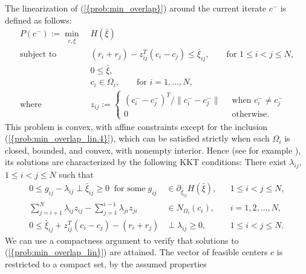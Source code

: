 \documentclass{siamltex}
\providecommand{\norm}[1]{\lVert#1\rVert}
\begin{document}
The linearization of {(\ref{{prob:min_overlap}})} around the current
iterate $c^-$ is defined as follows:
\begin{subequations}
\label{prob:min_overlap_lin}
\begin{align}
P(c^-) := \min_{c,\bar{\xi}} \; &
H(\bar{\xi}) 
\label{prob:min_overlap_lin.1}
\\
\mbox{subject to} \qquad &
(r_i + r_j) - z_{ij}^T (c_i - c_j) \leq \bar{\xi}_{ij},
\qquad \mbox{for }  1\leq i< j \leq N,
\label{prob:min_overlap_lin.2}
\\
& 0 \leq \bar{\xi}, 
\label{prob:min_overlap_lin.3}
\\
& c_i \in \Omega_i, \qquad
\mbox{for }  i = 1,\dots , N,  
\label{prob:min_overlap_lin.4}
\\
\mbox{where } \;\;
& z_{ij} := 
\begin{cases}
{(c_i^--c_j^-)^T}/{\norm{c_i^--c_j^-}} & \;\; \mbox{when $c_i^- \neq c_j^-$} \\
0 & \;\; \mbox{otherwise.}
\end{cases}
\label{prob:min_overlap_lin.5}
\end{align}
\end{subequations}
This problem is convex, with affine constraints except for the
inclusion {(\ref{{prob:min_overlap_lin.4}})}, which can be satisfied
strictly when each $\Omega_i$ is closed, bounded, and convex, with
nonempty interior. Hence (see for example
\cite[Theorem~28.2, Corollary~28.3.1]{Roc70}), its solutions are
characterized by the following KKT conditions: There exist
$\lambda_{ij}$, $1 \le i < j \le N$ such that
\begin{subequations}
\label{prob:min_overlap_lin_kkt}
\begin{align}
\label{prob:min_overlap_lin_kkt.1}
0 \le g_{ij} - \lambda_{ij}  \perp \bar{\xi}_{ij} \ge 0 \;\; \mbox{for some} \; g_{ij} 
& \in \partial_{\bar{\xi}_{ij}} H(\bar{\xi}), && 1 \le i < j \le N, 
\\
\label{prob:min_overlap_lin_kkt.2}
\sum_{j=i+1}^{N} \lambda_{ij} z_{ij} - 
\sum_{j=1}^{i-1} \lambda_{ji} z_{ji} & \in N_{\Omega_i}(c_i), && i=1,2,\dotsc,N,
\\
\label{prob:min_overlap_lin_kkt.3}
0 \le \bar{\xi}_{ij} + z_{ij}^T(c_i-c_j)-(r_i+r_j) & \perp \lambda_{ij} \ge 0, 
&& 1 \le i < j \le N.
\end{align}
\end{subequations}
We can use a compactness argument to verify that solutions to
{(\ref{{prob:min_overlap_lin}})} are attained. The vector of feasible
centers $c$ is restricted to a compact set, by the assumed properties
\end{document}
